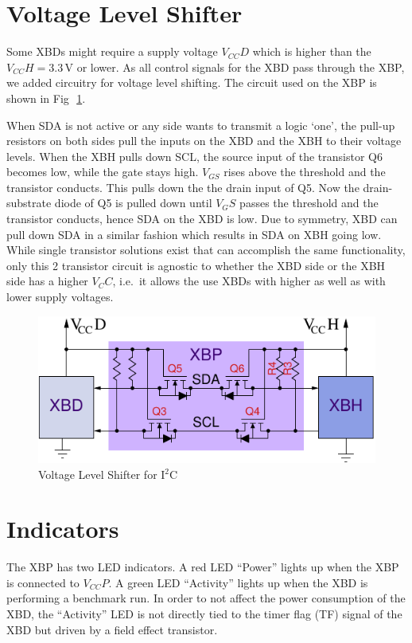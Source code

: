 \documentclass[twoside,11pt]{cergdoc}
\begin{document}
\section{Voltage Level Shifter}\label{sec:shifter}
Some XBDs might require a supply voltage $V_{CC}D$ which is higher than the $V_{CC}H = 3.3$\,V
or lower. As all control signals for the XBD pass through the XBP, we added circuitry for
voltage level shifting. The circuit used on the XBP is shown in Fig\,~\ref{fig:voltagelevel}. 

When SDA is not active or any side wants to transmit a logic `one', the pull-up resistors on both 
sides pull the inputs on the XBD and the XBH to their voltage levels. 
When the XBH pulls down SCL, the source input of the transistor Q6 becomes low, while the gate stays high. 
$V_{GS}$ rises above the threshold and the transistor conducts. This pulls down the 
the drain input of Q5. Now the drain-substrate diode of Q5 is pulled down until $V_GS$ passes the
threshold and the transistor conducts, hence
SDA on the XBD is low. 
Due to symmetry, XBD can pull down SDA in a similar fashion which results in SDA on XBH going low.
While single transistor solutions exist that can accomplish the same functionality,
only this 2 transistor circuit is agnostic to whether the XBD side or the XBH side has a higher
$V_CC$, i.e.\ it allows the use XBDs with higher as well as with lower supply
voltages. 

\begin{figure}[ht]
  \begin{center}
    \includegraphics[scale=1]{figures/voltagelevel}
    \caption{Voltage Level Shifter for I$^2$C}\label{fig:voltagelevel}
  \end{center}
\end{figure}

\section{Indicators}
The XBP has two LED indicators. A red LED ``Power'' lights up when the XBP is connected to $V_{CC}P$.
A green LED ``Activity'' lights up when the XBD is performing a benchmark run.
In order to not affect the power consumption of the XBD, the ``Activity'' LED is not directly 
tied to the timer flag (TF) signal of the XBD but driven by a field effect transistor.
\end{document}
